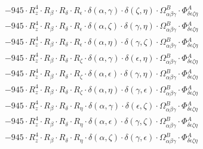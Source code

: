 \documentclass{article}
\begin{document}
\begin{equation}
\begin{array}{c}
 \\[0.2em] 		 - 945 \cdot R_{z}^{4} \cdot R_{\beta{}} \cdot R_{\delta{}} \cdot R_{\epsilon{}} \cdot \delta{}\left(\alpha{}, \gamma{}\right) \cdot \delta{}\left(\zeta{}, \eta{}\right) \cdot \Omega{}^{B}_{\alpha{}\beta{}\gamma{}} \cdot \Phi{}^{A}_{\delta{}\epsilon{}\zeta{}\eta{}} 
 \\[0.2em] 		 - 945 \cdot R_{z}^{4} \cdot R_{\beta{}} \cdot R_{\delta{}} \cdot R_{\epsilon{}} \cdot \delta{}\left(\alpha{}, \zeta{}\right) \cdot \delta{}\left(\gamma{}, \eta{}\right) \cdot \Omega{}^{B}_{\alpha{}\beta{}\gamma{}} \cdot \Phi{}^{A}_{\delta{}\epsilon{}\zeta{}\eta{}} 
 \\[0.2em] 		 - 945 \cdot R_{z}^{4} \cdot R_{\beta{}} \cdot R_{\delta{}} \cdot R_{\epsilon{}} \cdot \delta{}\left(\alpha{}, \eta{}\right) \cdot \delta{}\left(\gamma{}, \zeta{}\right) \cdot \Omega{}^{B}_{\alpha{}\beta{}\gamma{}} \cdot \Phi{}^{A}_{\delta{}\epsilon{}\zeta{}\eta{}} 
 \\[0.2em] 		 - 945 \cdot R_{z}^{4} \cdot R_{\beta{}} \cdot R_{\delta{}} \cdot R_{\zeta{}} \cdot \delta{}\left(\alpha{}, \gamma{}\right) \cdot \delta{}\left(\epsilon{}, \eta{}\right) \cdot \Omega{}^{B}_{\alpha{}\beta{}\gamma{}} \cdot \Phi{}^{A}_{\delta{}\epsilon{}\zeta{}\eta{}} 
 \\[0.2em] 		 - 945 \cdot R_{z}^{4} \cdot R_{\beta{}} \cdot R_{\delta{}} \cdot R_{\zeta{}} \cdot \delta{}\left(\alpha{}, \epsilon{}\right) \cdot \delta{}\left(\gamma{}, \eta{}\right) \cdot \Omega{}^{B}_{\alpha{}\beta{}\gamma{}} \cdot \Phi{}^{A}_{\delta{}\epsilon{}\zeta{}\eta{}} 
 \\[0.2em] 		 - 945 \cdot R_{z}^{4} \cdot R_{\beta{}} \cdot R_{\delta{}} \cdot R_{\zeta{}} \cdot \delta{}\left(\alpha{}, \eta{}\right) \cdot \delta{}\left(\gamma{}, \epsilon{}\right) \cdot \Omega{}^{B}_{\alpha{}\beta{}\gamma{}} \cdot \Phi{}^{A}_{\delta{}\epsilon{}\zeta{}\eta{}} 
 \\[0.2em] 		 - 945 \cdot R_{z}^{4} \cdot R_{\beta{}} \cdot R_{\delta{}} \cdot R_{\eta{}} \cdot \delta{}\left(\alpha{}, \gamma{}\right) \cdot \delta{}\left(\epsilon{}, \zeta{}\right) \cdot \Omega{}^{B}_{\alpha{}\beta{}\gamma{}} \cdot \Phi{}^{A}_{\delta{}\epsilon{}\zeta{}\eta{}} 
 \\[0.2em] 		 - 945 \cdot R_{z}^{4} \cdot R_{\beta{}} \cdot R_{\delta{}} \cdot R_{\eta{}} \cdot \delta{}\left(\alpha{}, \epsilon{}\right) \cdot \delta{}\left(\gamma{}, \zeta{}\right) \cdot \Omega{}^{B}_{\alpha{}\beta{}\gamma{}} \cdot \Phi{}^{A}_{\delta{}\epsilon{}\zeta{}\eta{}} 
 \\[0.2em] 		 - 945 \cdot R_{z}^{4} \cdot R_{\beta{}} \cdot R_{\delta{}} \cdot R_{\eta{}} \cdot \delta{}\left(\alpha{}, \zeta{}\right) \cdot \delta{}\left(\gamma{}, \epsilon{}\right) \cdot \Omega{}^{B}_{\alpha{}\beta{}\gamma{}} \cdot \Phi{}^{A}_{\delta{}\epsilon{}\zeta{}\eta{}} 

\end{array}
\end{equation}
\end{document}
